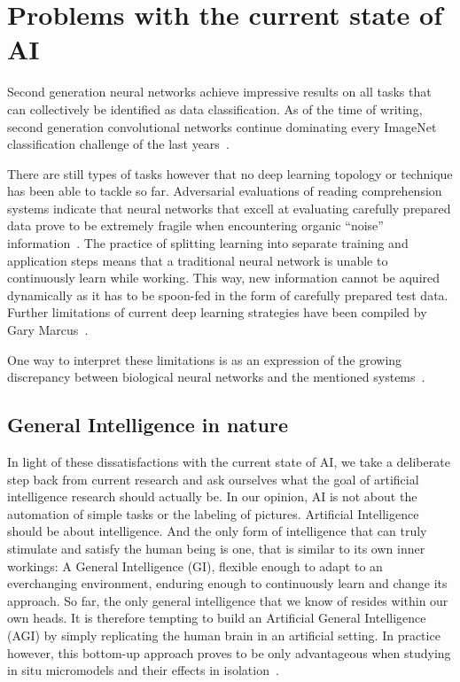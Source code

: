 \section{Problems with the current state of AI}

Second generation neural networks achieve impressive results
on all tasks that can collectively be identified as data classification.
As of the time of writing, second generation convolutional networks
continue dominating every ImageNet classification challenge of the last
years~\cite{ILSVRC15}.

There are still types of tasks however that no deep learning topology or 
technique has been able to tackle so far. Adversarial evaluations of reading comprehension
systems indicate that neural networks that excell at evaluating carefully
prepared data prove to be extremely fragile when encountering organic ``noise''
information~\cite{DBLP:journals/corr/JiaL17}.
The practice of splitting learning into separate training and application steps
means that a traditional neural network is unable to continuously learn while working.
This way, new information cannot be aquired dynamically as it has to be spoon-fed in the
form of carefully prepared test data.
Further limitations of current deep learning strategies have been compiled by 
Gary Marcus~\cite{DBLP:journals/corr/abs-1801-00631}.

One way to interpret these limitations is as an expression of the growing discrepancy between
biological neural networks and the mentioned systems~\cite{Paugam-Moisy2012}.

\subsection{General Intelligence in nature}
In light of these dissatisfactions with the current state of AI, we take a deliberate step back 
from current research and ask ourselves what the goal of artificial intelligence research should actually be.
In our opinion, AI is not about the automation of simple tasks or the labeling of pictures. 
Artificial Intelligence should be about intelligence. And the only form of intelligence that can truly
stimulate and satisfy the human being is one, that is similar to its own inner workings: A General Intelligence (GI),
flexible enough to adapt to an everchanging environment, enduring enough to continuously learn and change its approach.
So far, the only general intelligence that we know of resides within our own heads. It is therefore tempting to
build an Artificial General Intelligence (AGI) by simply replicating the human brain in an artificial setting. In practice
however, this bottom-up approach proves to be only advantageous when studying in situ micromodels and 
their effects in isolation~\cite{Dudai2014}. 

